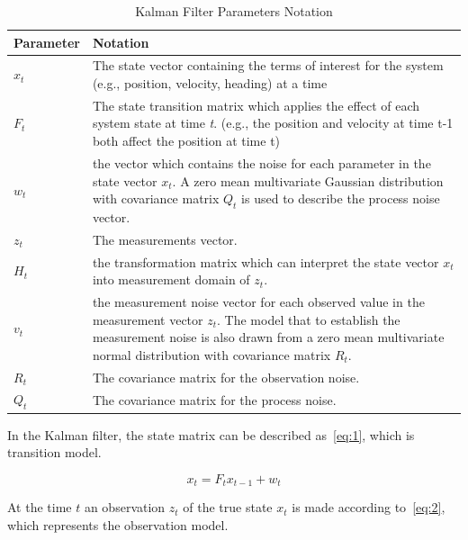\documentclass[11pt, a4paper]{article}
\begin{document}
\begin{table}[htbp] 
	\begin{center}
		\caption{Kalman Filter Parameters Notation}
		\begin{tabular}{|l|p{400pt}|} \hline
			Parameter & Notation \\ \hline
			${x_t}$ & The state vector containing the terms of interest for the system (e.g., position, velocity, heading) at a time 
			\\ \hline
			${F_t}$ & The state transition matrix which applies the effect of each system state at time \textit{t}. (e.g., the position and velocity at time t-1 both affect the position at time t) \\ \hline
			${w_t}$ & the vector which contains the noise for each parameter in the state vector ${x_t}$. A zero mean multivariate Gaussian distribution with covariance matrix ${Q_t}$ is used to describe the process noise vector. \\ \hline
			${z_t}$ & The measurements vector. \\ \hline
			${H_t}$ & the transformation matrix which can interpret the state vector ${x_t}$ into measurement domain of ${z_t}$. \\ \hline
			${v_t}$ &  the measurement noise vector for each observed value in the measurement vector ${z_t}$. The model that to establish the measurement noise is also drawn from a zero mean multivariate normal distribution with covariance matrix ${R_t}$. \\ \hline
			${R_t}$ & The covariance matrix for the observation noise. \\ \hline
			${Q_t}$ & The covariance matrix for the process noise. \\ \hline
			
		\end{tabular}
		
		\label{tab:kf_meaning}
	\end{center}
\end{table}

In the Kalman filter, the state matrix can be described as~\ref{eq:1}, which is transition model.

\begin{equation}
x_{t} = F_{t}x_{t-1} + w_t 
\end{equation}\label{eq:1}

At the time $t$ an observation $z_t$ of the true state $x_t$ is made according to~\ref{eq:2}, which represents the observation model.
\end{document}
